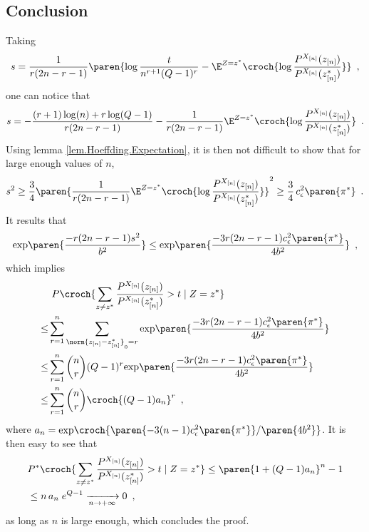 \documentclass[11pt]{article}
\newcommand{\Xn}{X_{[n]}}
\newcommand{\zn}{z_{[n]}}
\newcommand{\PXn}{P^{\Xn}}
\begin{document}
\subsection{Conclusion}
Taking
\begin{align*}
        s = \frac{1}{r(2n-r-1)} \paren{ \log
\frac{t}{n^{r+1}(Q-1)^{r}} -\E^{Z=z^*}
\croch{ \log \frac{\PXn(\zn)}{\PXn(\zn^*)} }}\enspace,
\end{align*}
one can notice that
\begin{align*}
        s =  -\frac{(r+1)\log(n) +r\log(Q-1)}{r(2n-r-1)} -\frac{1}{r(2n-r-1)}\E^{Z=z^*}
\croch{ \log \frac{\PXn(\zn)}{\PXn(\zn^*)} }\enspace.
\end{align*}
%
Using lemma \ref{lem.Hoeffding.Expectation}, it is then not difficult to show that for large enough values of $n$,
\begin{align*}
s^2 \geq \frac{3}{4}\paren{\frac{1}{r(2n-r-1)}\E^{Z=z^*}
\croch{ \log \frac{\PXn(\zn)}{\PXn(\zn^*)} }}^2
\geq  \frac{3}{4}\, c_{\epsilon}^2\paren{\pi^*}
\enspace.
\end{align*}
%
It results that
\begin{align*}
\mathrm{exp}\paren{\frac{-r(2n-r-1)s^2}{b^2}} \leq \mathrm{exp}\paren{\frac{-3r(2n-r-1)c_{\epsilon}^2\paren{\pi^*}}{4 b^2}} \enspace,
\end{align*}
which implies
\begin{align*}
        &\ P \croch{ \sum_{z \neq z^*} \frac{\PXn(\zn)}{\PXn(\zn^*)} > t \mid Z=z^*}\\
 \leq & \sum_{r=1}^n \sum_{\norm{\zn-\zn^*}_0=r} \mathrm{exp}\paren{\frac{-3r(2n-r-1)c_{\epsilon}^2\paren{\pi^*}}{4 b^2}} \\
 \leq & \sum_{r=1}^n {n \choose r} (Q-1)^r \mathrm{exp}\paren{\frac{-3r(2n-r-1)c_{\epsilon}^2\paren{\pi^*}}{4 b^2}}\\
 \leq & \sum_{r=1}^n {n \choose r} \croch{(Q-1) a_n}^r
\enspace ,
\end{align*}
where $a_n=\mathrm{exp}\croch{\paren{-3(n-1)c_{\epsilon}^2\paren{\pi^*}}/\paren{4 b^2}}$.
%
It is then easy to see that
\begin{align*}
& P^* \croch{ \sum_{z \neq z^*} \frac{\PXn(\zn)}{\PXn(\zn^*)} > t \mid Z=z^*} \leq \paren{1+(Q-1) a_n}^n-1 \\
& \leq n \, a_n\; e^{Q-1} \xrightarrow[n\to +\infty]{}0 \enspace,
\end{align*}
as long as $n$ is large enough, which concludes the proof.
\end{document}
